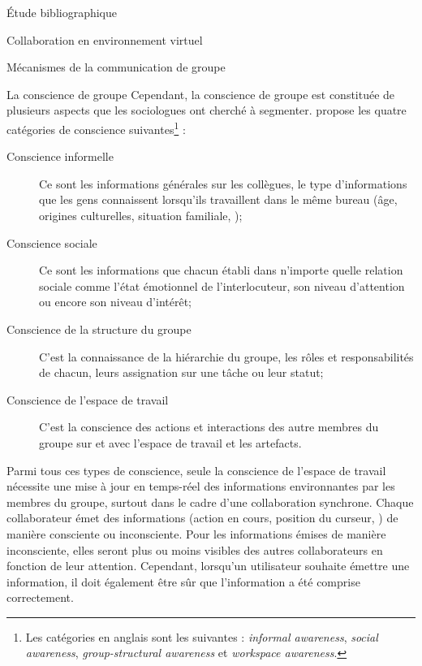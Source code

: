 \documentclass[myfrancais,ngerman,english,frenchb]{mythesis}
\begin{document}
\begin{mychapter}{Étude bibliographique}
\begin{mysection}{Collaboration en environnement virtuel}
\begin{mysubsection}{Mécanismes de la communication de groupe}
\begin{mysubsubsection}{La conscience de groupe}
					Cependant, la conscience de groupe est constituée de plusieurs aspects que les sociologues ont cherché à segmenter.
					 propose les quatre catégories de conscience suivantes\footnote{Les catégories en anglais sont les suivantes : \textit{informal awareness}, \textit{social awareness}, \textit{group-structural awareness} et \textit{workspace awareness}.} :
					\begin{description}
						\item[Conscience informelle] Ce sont les informations générales sur les collègues, le type d'informations que les gens connaissent lorsqu'ils travaillent dans le même bureau (âge, origines culturelles, situation familiale, \myetc);
						\item[Conscience sociale] Ce sont les informations que chacun établi dans n'importe quelle relation sociale comme l'état émotionnel de l'interlocuteur, son niveau d'attention ou encore son niveau d'intérêt;
						\item[Conscience de la structure du groupe] C'est la connaissance de la hiérarchie du groupe, les rôles et responsabilités de chacun, leurs assignation sur une tâche ou leur statut;
						\item[Conscience de l'espace de travail] C'est la conscience des actions et interactions des autre membres du groupe sur et avec l'espace de travail et les artefacts.
					\end{description}

					Parmi tous ces types de conscience, seule la conscience de l'espace de travail nécessite une mise à jour en temps-réel des informations environnantes par les membres du groupe, surtout dans le cadre d'une collaboration synchrone.
					Chaque collaborateur émet des informations (action en cours, position du curseur, \myetc) de manière consciente ou inconsciente.
					Pour les informations émises de manière inconsciente, elles seront plus ou moins visibles des autres collaborateurs en fonction de leur attention.
					Cependant, lorsqu'un utilisateur souhaite émettre une information, il doit également être sûr que l'information a été comprise correctement.


\end{mysubsubsection}
\end{mysubsection}
\end{mysection}
\end{mychapter}
\end{document}
